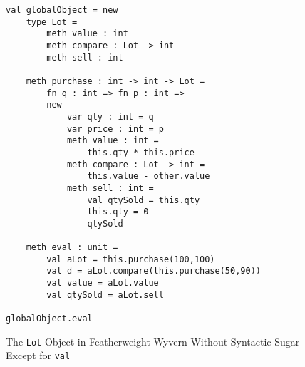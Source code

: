 \begin{figure}
  \centering
\begin{lstlisting}
val globalObject = new
	type Lot =
		meth value : int
		meth compare : Lot -> int
		meth sell : int

	meth purchase : int -> int -> Lot =
		fn q : int => fn p : int =>
		new
			var qty : int = q
			var price : int = p
			meth value : int =
				this.qty * this.price
			meth compare : Lot -> int =
				this.value - other.value
			meth sell : int =
				val qtySold = this.qty
				this.qty = 0
				qtySold
				
	meth eval : unit =
		val aLot = this.purchase(100,100)
		val d = aLot.compare(this.purchase(50,90))
		val value = aLot.value
		val qtySold = aLot.sell
		
globalObject.eval
\end{lstlisting}
\caption{The \texttt{Lot} Object in Featherweight Wyvern Without Syntactic 
Sugar Except for \lstinline{val}}
\label{f-core2-example-nosugar}
\end{figure}
